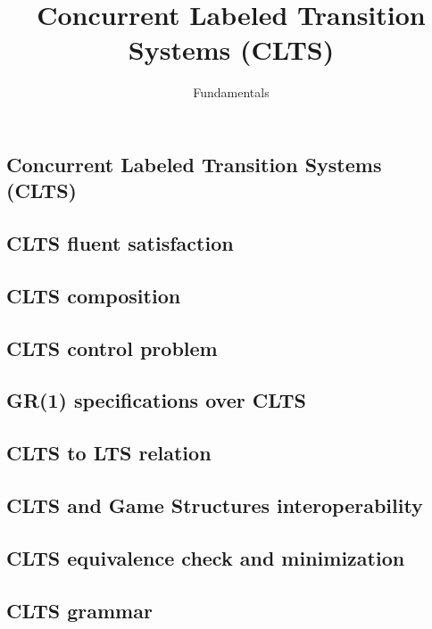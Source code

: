 \documentclass{article}
\title{Concurrent Labeled Transition Systems (CLTS)} %
\author{Fundamentals} %
\date{}
\begin{document}
\maketitle

\setcounter{section}{1} %
\setcounter{theorem}{1} %

\subsection{Concurrent Labeled Transition Systems (CLTS)}


\subsection{CLTS fluent satisfaction}


\subsection{CLTS composition}


\newpage
\subsection{CLTS control problem}


\newpage
\subsection{GR(1) specifications over CLTS}


\newpage
\subsection{CLTS to LTS relation}


\newpage
\subsection{CLTS and Game Structures interoperability}


\newpage
\subsection{CLTS equivalence check and minimization}


\subsection{CLTS grammar}

\newpage


\end{document}
